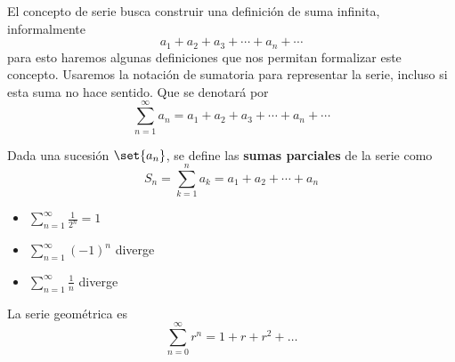 
\begin{frame}
  El concepto de serie busca construir una definición de suma infinita, informalmente
  $$a_1+a_2+a_3+\cdots+a_n+\cdots$$
  para esto haremos algunas definiciones que nos permitan formalizar este concepto. Usaremos la notación de sumatoria para representar la serie, incluso si esta suma no hace sentido. Que se denotará por
  $$\sum_{n=1}^{\infty}a_n=a_1+a_2+a_3+\cdots+a_n+\cdots$$
\end{frame}

\begin{frame}
  \begin{defn}
    Dada una sucesión $\set{a_n}$, se define las \textbf{sumas parciales} de la serie como
    $$S_n=\sum_{k=1}^{n}a_k=a_1+a_2+\cdots+a_n$$
  \end{defn}
\end{frame}

\begin{frame}
  \begin{egs}
    \vspace{3mm}
    \begin{itemize}[<+->]
      \item $\displaystyle\sum_{n=1}^{\infty}\frac{1}{2^n}=1$\\[0.5cm]
      \item $\displaystyle\sum_{n=1}^{\infty}(-1)^n$ diverge\\[0.5cm]
      \item $\displaystyle\sum_{n=1}^{\infty}\frac{1}{n}$ diverge\\[0.5cm]
    \end{itemize}
  \end{egs}
\end{frame}

\begin{frame}
  La serie geométrica es
  $$\sum_{n=0}^{\infty}r^n=1+r+r^2+\ldots$$
\end{frame}

